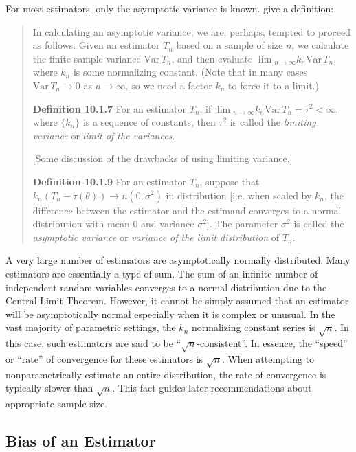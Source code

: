 \documentclass[english]{article}
\begin{document}
For most estimators, only the asymptotic variance is known. \cite{CasellaBerger2002}
give a definition:
\begin{quote}
In calculating an asymptotic variance, we are, perhaps, tempted to
proceed as follows. Given an estimator $T_{n}$ based on a sample
of size $n$, we calculate the finite-sample variance $\mathrm{Var}\,T_{n}$,
and then evaluate $\lim\!_{n\rightarrow\infty}k_{n}\mathrm{Var}\,T_{n}$,
where $k_{n}$ is some normalizing constant. (Note that in many cases
$\mathrm{Var}\,T_{n}\rightarrow0$ as $n\rightarrow\infty$, so we
need a factor $k_{n}$ to force it to a limit.)

\textbf{Definition 10.1.7} For an estimator $T_{n}$, if $\lim\!_{n\rightarrow\infty}k_{n}\mathrm{Var}\,T_{n}=\tau^{2}<\infty$,
where $\{k_{n}\}$ is a sequence of constants, then $\tau^{2}$ is
called the \textit{limiting variance} or \textit{limit of the variances.}

{[}Some discussion of the drawbacks of using limiting variance.{]}

\textbf{Definition 10.1.9} For an estimator $T_{n}$, suppose that
$k_{n}(T_{n}-\tau(\theta))\rightarrow n(0,\sigma^{2})$ in distribution
{[}i.e. when scaled by $k_{n}$, the difference between the estimator
and the estimand converges to a normal distribution with mean 0 and
variance $\sigma^{2}${]}. The parameter $\sigma^{2}$ is called the
\textit{asymptotic variance} or \textit{variance of the limit distribution}
of $T_{n}$.
\end{quote}
A very large number of estimators are asymptotically normally distributed.
Many estimators are essentially a type of sum. The sum of an infinite
number of independent random variables converges to a normal distribution
due to the Central Limit Theorem. However, it cannot be simply assumed
that an estimator will be asymptotically normal especially when it
is complex or unusual. In the vast majority of parametric settings,
the $k_{n}$ normalizing constant series is $\sqrt{n}$. In this case,
such estimators are said to be ``$\sqrt{n}$-consistent''. In essence,
the ``speed'' or ``rate'' of convergence for these estimators
is $\sqrt{n}$. When attempting to nonparametrically estimate an entire
distribution, the rate of convergence is typically slower than $\sqrt{n}$.
This fact guides later recommendations about appropriate sample size.

\subsection{Bias of an Estimator}
\end{document}
